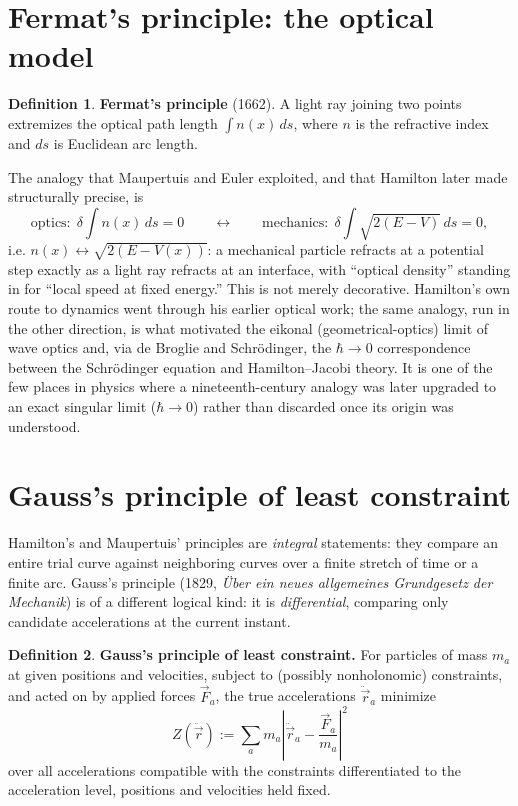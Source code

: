 \documentclass[11pt]{book}
\theoremstyle{definition}
\newtheorem{definition}{Definition}[section]
\theoremstyle{plain}
\theoremstyle{remark}
\begin{document}
\section{Fermat's principle: the optical model}
\label{sec:fermat}

\begin{definition}
\textbf{Fermat's principle} (1662). A light ray joining two points extremizes the optical path length $\int n(x)\,ds$, where $n$ is the refractive index and $ds$ is Euclidean arc length.
\end{definition}

The analogy that Maupertuis and Euler exploited, and that Hamilton later made structurally precise, is
\[
\text{optics:}\ \ \delta\!\int n(x)\,ds = 0
\qquad\longleftrightarrow\qquad
\text{mechanics:}\ \ \delta\!\int \sqrt{2(E-V)}\,ds = 0,
\]
i.e. $n(x)\leftrightarrow\sqrt{2(E-V(x))}$: a mechanical particle refracts at a potential step exactly as a light ray refracts at an interface, with ``optical density'' standing in for ``local speed at fixed energy.'' This is not merely decorative. Hamilton's own route to dynamics went through his earlier optical work; the same analogy, run in the other direction, is what motivated the eikonal (geometrical-optics) limit of wave optics and, via de Broglie and Schrödinger, the $\hbar\to0$ correspondence between the Schrödinger equation and Hamilton--Jacobi theory. It is one of the few places in physics where a nineteenth-century analogy was later upgraded to an exact singular limit ($\hbar\to0$) rather than discarded once its origin was understood.

\section{Gauss's principle of least constraint}
\label{sec:gauss}

Hamilton's and Maupertuis' principles are \emph{integral} statements: they compare an entire trial curve against neighboring curves over a finite stretch of time or a finite arc. Gauss's principle (1829, \emph{Über ein neues allgemeines Grundgesetz der Mechanik}) is of a different logical kind: it is \emph{differential}, comparing only candidate accelerations at the current instant.

\begin{definition}
\textbf{Gauss's principle of least constraint.} For particles of mass $m_a$ at given positions and velocities, subject to (possibly nonholonomic) constraints, and acted on by applied forces $\vec F_a$, the true accelerations $\ddot{\vec r}_a$ minimize
\[
Z(\ddot{\vec r}) := \sum_a m_a\left|\ddot{\vec r}_a - \frac{\vec F_a}{m_a}\right|^2
\]
over all accelerations compatible with the constraints differentiated to the acceleration level, positions and velocities held fixed.
\end{definition}
\end{document}
